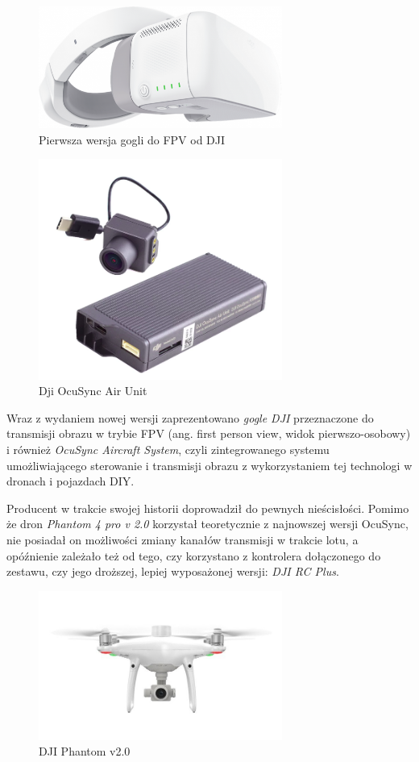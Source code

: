 \begin{figure}[!ht]
  \centering
  \includegraphics[width=8cm]{./Obrazy/dji-google.png}
  \caption{Pierwsza wersja gogli do FPV od DJI}
  \end{figure}
  

\begin{figure}[!ht]
  \centering
  \includegraphics[width=8cm]{./Obrazy/dji-air-unit.png}
  \caption{Dji OcuSync Air Unit}
  \end{figure}

Wraz z wydaniem nowej wersji zaprezentowano \textit{gogle DJI} przeznaczone do transmisji obrazu w trybie FPV (ang. first person view, widok pierwszo-osobowy) i również \textit{OcuSync Aircraft System}, czyli zintegrowanego systemu umożliwiającego sterowanie i transmisji obrazu z wykorzystaniem tej technologi w dronach i pojazdach DIY.

Producent w trakcie swojej historii doprowadził do pewnych nieścisłości. Pomimo że dron \textit{Phantom 4 pro v 2.0} korzystał teoretycznie z najnowszej wersji OcuSync, nie posiadał on możliwości zmiany kanałów transmisji w trakcie lotu, a opóźnienie zależało też od tego, czy korzystano z kontrolera dołączonego do zestawu, czy jego droższej, lepiej wyposażonej wersji: \textit{DJI RC Plus}.
  

\begin{figure}[!ht]
  \centering
  \includegraphics[width=8cm]{./Obrazy/dji-phantom-v2.jpg}
  \caption{DJI Phantom v2.0}
  \end{figure}
  

